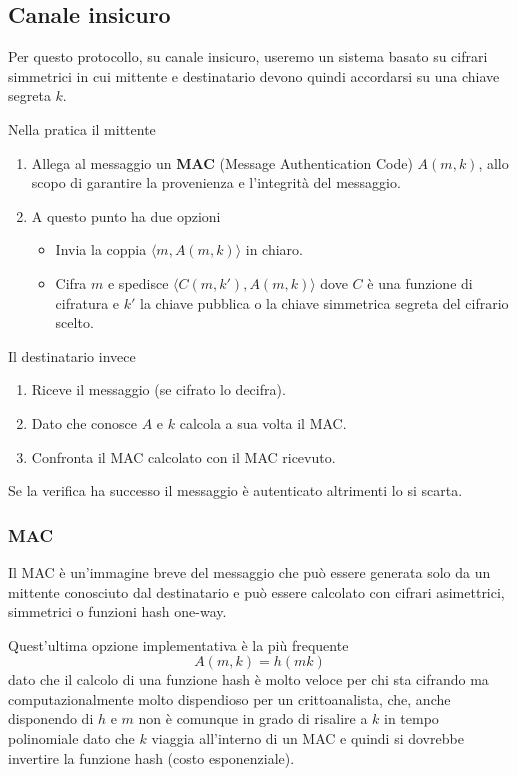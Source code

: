 \subsection{Canale insicuro}
Per questo protocollo, su canale insicuro, useremo un sistema basato su cifrari simmetrici in cui mittente e
destinatario devono quindi accordarsi su una chiave segreta $k$.

Nella pratica il mittente
\begin{enumerate}
	\item Allega al messaggio un \textbf{MAC} (Message Authentication Code) $A(m, k)$, allo scopo di garantire la
	      provenienza e l'integrit\`a del messaggio.
	\item A questo punto ha due opzioni
	      \begin{itemize}
		      \item Invia la coppia $\langle m, A(m, k) \rangle$ in chiaro.
		      \item Cifra $m$ e spedisce $\langle C(m, k'), A(m, k) \rangle$ dove $C$ \`e una funzione di cifratura
		            e $k'$ la chiave pubblica o la chiave simmetrica segreta del cifrario scelto.
	      \end{itemize}
\end{enumerate}

Il destinatario invece
\begin{enumerate}
	\item Riceve il messaggio (se cifrato lo decifra).
	\item Dato che conosce $A$ e $k$ calcola a sua volta il MAC.
	\item Confronta il MAC calcolato con il MAC ricevuto.
\end{enumerate}
Se la verifica ha successo il messaggio \`e autenticato altrimenti lo si scarta.

\subsubsection{MAC}
Il MAC \`e un'immagine breve del messaggio che pu\`o essere generata solo da un mittente conosciuto dal destinatario
e pu\`o essere calcolato con cifrari asimettrici, simmetrici o funzioni hash one-way.

Quest'ultima opzione implementativa \`e la pi\`u frequente
\[ A(m, k) = h(m k) \]
dato che il calcolo di una funzione hash \`e molto veloce per chi sta cifrando ma computazionalmente molto dispendioso
per un crittoanalista, che, anche disponendo di $h$ e $m$ non \`e comunque in grado di risalire a $k$ in tempo
polinomiale dato che $k$ viaggia all'interno di un MAC e quindi si dovrebbe invertire la funzione hash (costo
esponenziale).

